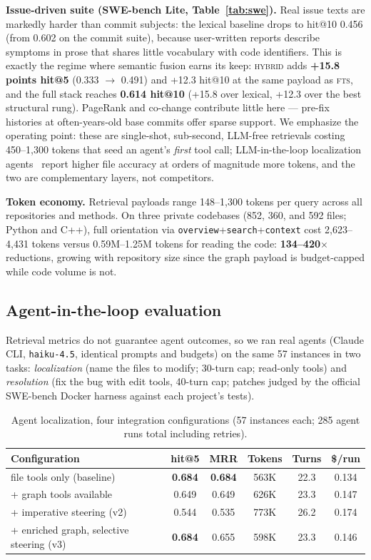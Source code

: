 \documentclass[11pt]{article}
\begin{document}
\textbf{Issue-driven suite (SWE-bench Lite, Table~\ref{tab:swe}).}
Real issue texts are markedly harder than commit subjects: the lexical
baseline drops to hit@10 0.456 (from 0.602 on the commit suite), because
user-written reports describe symptoms in prose that shares little
vocabulary with code identifiers. This is exactly the regime where
semantic fusion earns its keep: \textsc{hybrid} adds \textbf{+15.8 points
hit@5} (0.333 $\rightarrow$ 0.491) and +12.3 hit@10 at the same payload as
\textsc{fts}, and the full stack reaches \textbf{0.614 hit@10} (+15.8 over
lexical, +12.3 over the best structural rung). PageRank and co-change
contribute little here --- pre-fix histories at often-years-old base
commits offer sparse support. We emphasize the operating point: these are
single-shot, sub-second, LLM-free retrievals costing 450--1{,}300 tokens
that seed an agent's \emph{first} tool call; LLM-in-the-loop localization
agents~\cite{locagent} report higher file accuracy at orders of magnitude
more tokens, and the two are complementary layers, not competitors.

\textbf{Token economy.} Retrieval payloads range 148--1{,}300 tokens per
query across all repositories and methods. On three private codebases
(852, 360, and 592 files; Python and C++), full orientation via
\texttt{overview}+\texttt{search}+\texttt{context} cost 2{,}623--4{,}431
tokens versus 0.59M--1.25M tokens for reading the code:
\textbf{134--420$\times$} reductions, growing with repository size since
the graph payload is budget-capped while code volume is not.

\subsection{Agent-in-the-loop evaluation}
Retrieval metrics do not guarantee agent outcomes, so we ran real agents
(Claude CLI, \texttt{haiku-4.5}, identical prompts and budgets) on the
same 57 instances in two tasks: \emph{localization} (name the files to
modify; 30-turn cap; read-only tools) and \emph{resolution} (fix the bug
with edit tools, 40-turn cap; patches judged by the official SWE-bench
Docker harness against each project's tests).

\begin{table}[t]
\centering
\caption{Agent localization, four integration configurations
(57 instances each; 285 agent runs total including retries).}
\small
\begin{tabular}{lccccc}
\toprule
Configuration & hit@5 & MRR & Tokens & Turns & \$/run \\
\midrule
file tools only (baseline)    & \textbf{0.684} & \textbf{0.684} & 563K & 22.3 & 0.134 \\
+ graph tools available        & 0.649 & 0.649 & 626K & 23.3 & 0.147 \\
+ imperative steering (v2)     & 0.544 & 0.535 & 773K & 26.2 & 0.174 \\
+ enriched graph, selective steering (v3) & \textbf{0.684} & 0.655 & 598K & 23.3 & 0.146 \\
\bottomrule
\end{tabular}
\label{tab:agentloc}
\end{table}
\end{document}

